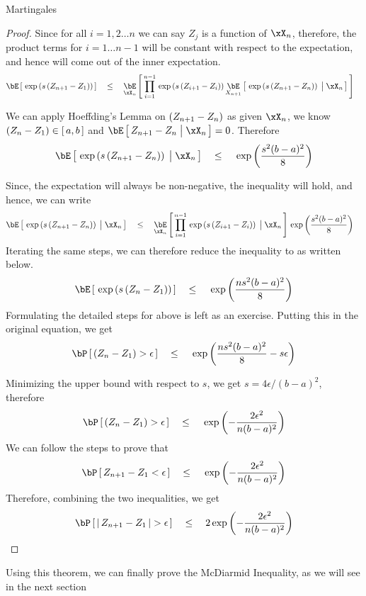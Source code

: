 \documentclass{article}
\begin{document}
\begin{ssection}{Martingales}
\begin{proof}
		Since for all $i = 1, 2 \dots n$ we can say $Z_j$ is a function of $\xX_n$, therefore, the product terms for $i = 1 \dots n - 1$ will be constant with respect to the expectation, and hence will come out of the inner expectation.
		\begin{align*}
			\E{\texp{s \para{Z_{n + 1} - Z_1}}} & \qle	\E[\xX_n]{\prod_{i = 1}^{n - 1} \texp{s \para{Z_{i + 1} - Z_i}} \E[X_{n + 1}]{\texp{s \para{Z_{n + 1} - Z_n}} \pipe \xX_n}} 
		\end{align*}
		
		We can apply Hoeffding's Lemma on $\left( {Z_{n + 1} - Z_n} \right)$ as given $\xX_n$, we know $\left( {Z_n - Z_1} \right) \in \left[\,{a, b}\,\right]$ and $\E{Z_{n+1} - Z_n \pipe \xX_n} = 0$. Therefore
		\begin{align*}
			\E{\texp{s \para{Z_{n + 1} - Z_n}} \pipe \xX_n}	\qle	\texp{\frac{s^2 (b - a)^2}{8}} 
		\end{align*}
		
		Since, the expectation will always be non-negative, the inequality will hold, and hence, we can write
		\begin{align*}
			\E{\texp{s \para{Z_{n + 1} - Z_n}} \pipe \xX_n} & \qle	\E[\xX_n]{\prod_{i = 1}^{n - 1} \texp{s \para{Z_{i + 1} - Z_i}} \pipe \xX_n} \texp{\frac{s^2 (b - a)^2}{8}} 
		\end{align*}
		Iterating the same steps, we can therefore reduce the inequality to as written below.
		\begin{align*}
			\E{\texp{s \para{Z_n - Z_1}}}	\qle	\texp{\frac{n s^2 (b - a)^2}{8}} 
		\end{align*}
		Formulating the detailed steps for above is left as an exercise. Putting this in the original equation, we get
		\begin{align*}
			\prob{\para{Z_n - Z_1} > \epsilon}	\qle	\texp{\frac{n s^2 (b - a)^2}{8} - s \epsilon} 
		\end{align*}
		
		Minimizing the upper bound with respect to $s$, we get $s = 4 \epsilon / (b - a)^2$, therefore
		\begin{align*}
			\prob{\para{Z_n - Z_1} > \epsilon}	\qle	\texp{- \frac{2 \epsilon^2}{n (b - a)^2}} 
		\end{align*}
		We can follow the steps to prove that
		\begin{align*}
			\prob{Z_{n + 1} - Z_1 < \epsilon}	\qle	\texp{- \frac{2 \epsilon^2}{n (b - a)^2}} 
		\end{align*}
		Therefore, combining the two inequalities, we get
		\begin{align*}
			\prob{\abs{Z_{n + 1} - Z_1} > \epsilon}	\qle	2 \texp{- \frac{2 \epsilon^2}{n (b - a)^2}} 
		\end{align*}
	\end{proof}
	
	
	Using this theorem, we can finally prove the McDiarmid Inequality, as we will see in the next section
	
\end{ssection}
\end{document}
